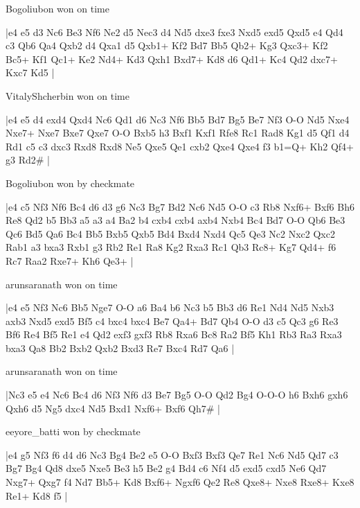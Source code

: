 \showboard

Bogoliubon won on time

\makegametitle
|e4 e5 d3 Nc6 Be3 Nf6 Ne2 d5 Nec3 d4 Nd5 dxe3 fxe3 Nxd5 exd5 Qxd5 e4 Qd4 c3 Qb6 Qa4 Qxb2 d4 Qxa1 d5 Qxb1+ Kf2 Bd7 Bb5 Qb2+ Kg3 Qxc3+ Kf2 Bc5+ Kf1 Qc1+ Ke2 Nd4+ Kd3 Qxh1 Bxd7+ Kd8 d6 Qd1+ Kc4 Qd2 dxc7+ Kxc7 Kd5  |

\showboard

VitalyShcherbin won on time

\makegametitle
|e4 e5 d4 exd4 Qxd4 Nc6 Qd1 d6 Nc3 Nf6 Bb5 Bd7 Bg5 Be7 Nf3 O-O Nd5 Nxe4 Nxe7+ Nxe7 Bxe7 Qxe7 O-O Bxb5 h3 Bxf1 Kxf1 Rfe8 Rc1 Rad8 Kg1 d5 Qf1 d4 Rd1 c5 c3 dxc3 Rxd8 Rxd8 Ne5 Qxe5 Qe1 cxb2 Qxe4 Qxe4 f3 b1=Q+ Kh2 Qf4+ g3 Rd2\#  |

\showboard

Bogoliubon won by checkmate

\makegametitle
|e4 c5 Nf3 Nf6 Bc4 d6 d3 g6 Nc3 Bg7 Bd2 Nc6 Nd5 O-O c3 Rb8 Nxf6+ Bxf6 Bh6 Re8 Qd2 b5 Bb3 a5 a3 a4 Ba2 b4 cxb4 cxb4 axb4 Nxb4 Bc4 Bd7 O-O Qb6 Be3 Qc6 Bd5 Qa6 Bc4 Bb5 Bxb5 Qxb5 Bd4 Bxd4 Nxd4 Qc5 Qe3 Nc2 Nxc2 Qxc2 Rab1 a3 bxa3 Rxb1 g3 Rb2 Re1 Ra8 Kg2 Rxa3 Rc1 Qb3 Rc8+ Kg7 Qd4+ f6 Rc7 Raa2 Rxe7+ Kh6 Qe3+  |

\showboard

arunsaranath won on time

\makegametitle
|e4 e5 Nf3 Nc6 Bb5 Nge7 O-O a6 Ba4 b6 Nc3 b5 Bb3 d6 Re1 Nd4 Nd5 Nxb3 axb3 Nxd5 exd5 Bf5 c4 bxc4 bxc4 Be7 Qa4+ Bd7 Qb4 O-O d3 c5 Qc3 g6 Re3 Bf6 Re4 Bf5 Re1 e4 Qd2 exf3 gxf3 Rb8 Rxa6 Bc8 Ra2 Bf5 Kh1 Rb3 Ra3 Rxa3 bxa3 Qa8 Bb2 Bxb2 Qxb2 Bxd3 Re7 Bxc4 Rd7 Qa6  |

\showboard

arunsaranath won on time

\makegametitle
|Nc3 e5 e4 Nc6 Bc4 d6 Nf3 Nf6 d3 Be7 Bg5 O-O Qd2 Bg4 O-O-O h6 Bxh6 gxh6 Qxh6 d5 Ng5 dxc4 Nd5 Bxd1 Nxf6+ Bxf6 Qh7\#  |

\showboard

eeyore\_batti won by checkmate

\makegametitle
|e4 g5 Nf3 f6 d4 d6 Nc3 Bg4 Be2 e5 O-O Bxf3 Bxf3 Qe7 Re1 Nc6 Nd5 Qd7 c3 Bg7 Bg4 Qd8 dxe5 Nxe5 Be3 h5 Be2 g4 Bd4 c6 Nf4 d5 exd5 cxd5 Ne6 Qd7 Nxg7+ Qxg7 f4 Nd7 Bb5+ Kd8 Bxf6+ Ngxf6 Qe2 Re8 Qxe8+ Nxe8 Rxe8+ Kxe8 Re1+ Kd8 f5  |

